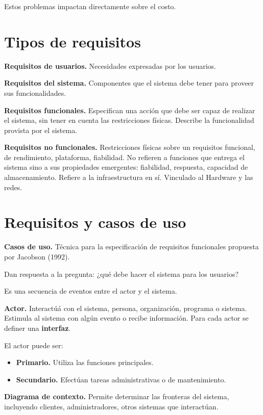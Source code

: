 \documentclass[12pt]{article}
\begin{document}
Estos problemas impactan directamente sobre el costo.

\section{Tipos de requisitos}

\textbf{Requisitos de usuarios.}
Necesidades expresadas por los usuarios.

\textbf{Requisitos del sistema.}
Componentes que el sistema debe tener para proveer sus funcionalidades.

\textbf{Requisitos funcionales.}
Especifican una acción que debe ser capaz de realizar el sistema,
sin tener en cuenta las restricciones físicas.
Describe la funcionalidad provista por el sistema.

\textbf{Requisitos no funcionales.}
Restricciones físicas sobre un requisitos funcional, de rendimiento,
plataforma, fiabilidad.
No refieren a funciones que entrega el sistema sino a sus propiedades emergentes:
fiabilidad, respuesta, capacidad de almacenamiento.
Refiere a la infraestructura en sí.
Vinculado al Hardware y las redes.

\section{Requisitos y casos de uso}

\textbf{Casos de uso.}
Técnica para la especificación de requisitos funcionales propuesta 
por Jacobson (1992).

Dan respuesta a la pregunta: 
¿qué debe hacer el sistema para los usuarios?

Es una secuencia de eventos entre el actor y el sistema.

\textbf{Actor.}
Interactúá con el sistema,
persona,
organización,
programa o sistema.
Estimula al sistema con algún evento o recibe información.
Para cada actor se definer una \textbf{interfaz}.

El actor puede ser:
\begin{itemize}
    \item \textbf{Primario.} 
    Utiliza las funciones principales.
    \item \textbf{Secundario.}
    Efectúan tareas administrativas o de mantenimiento.
\end{itemize}

\textbf{Diagrama de contexto.}
Permite determinar las fronteras del sistema,
incluyendo clientes,
administradores,
otros sistemas que interactúan.
\end{document}
